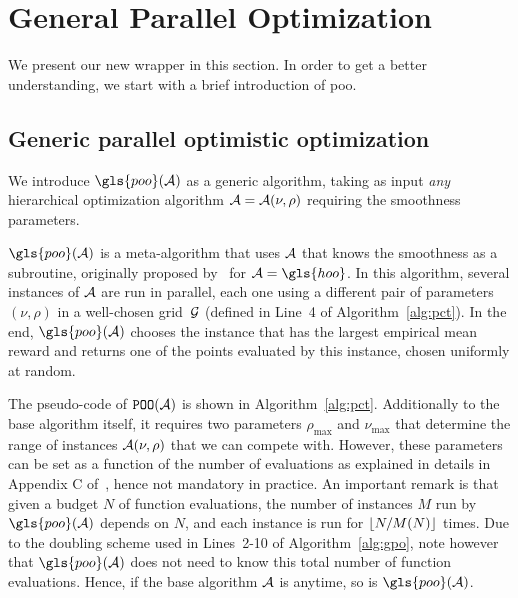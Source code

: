 \section{General Parallel Optimization}\label{sec:gpo.gpo}

We present our new wrapper in this section. In order to get a better understanding, we start with a brief introduction of \gls{poo}.

\subsection{Generic parallel optimistic optimization}\label{sec:gpo.gpo.generic}

We introduce $\gls{poo}(\cA)$ as a generic  algorithm, taking as input \emph{any} hierarchical optimization algorithm $\mathcal{A}=\mathcal{A}(\nu,\rho)$ requiring the smoothness parameters.

$\gls{poo}(\cA)$ is a meta-algorithm that uses $\mathcal{A}$ that knows the smoothness as a subroutine, originally proposed by~\cite{grill2015poo} for $\cA = \gls{hoo}$. In this algorithm, several instances of $\mathcal{A}$ are run in parallel, each one using a different pair of parameters $(\nu,\rho)$ in a well-chosen grid~$\mathcal{G}$ (defined in Line~4 of Algorithm~\ref{alg:pct}). In the end, $\gls{poo}(\cA)$ chooses the instance that has the largest empirical mean reward and returns one of the points evaluated by this instance, chosen uniformly at random.

The pseudo-code of $\texttt{POO}(\mathcal{A})$ is shown in Algorithm~\ref{alg:pct}. Additionally to the base algorithm itself, it requires two parameters $\rho_{\max}$ and $\nu_{\max}$ that determine the range of instances $\mathcal{A}(\nu,\rho)$ that we can compete with. However, these parameters can be set as a function of the number of evaluations as explained in details in Appendix C of~\cite{grill2015poo}, hence not mandatory in practice. An important remark is that given a budget $N$ of function evaluations, the number of instances $M$ run by $\gls{poo}(\cA)$ depends on $N$, and each instance is run for $\lfloor N/M(N)\rfloor$ times. Due to the doubling scheme used in Lines~2-10 of Algorithm~\ref{alg:gpo}, note however that $\gls{poo}(\cA)$ does not need to know this total number of function evaluations. Hence, if the base algorithm $\mathcal{A}$ is anytime, so is $\gls{poo}(\cA)$.

